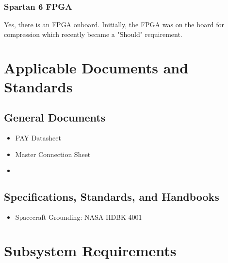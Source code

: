 \documentclass[12pt,a4paper]{article}
\begin{document}
    \subsubsection{Spartan 6 FPGA}
    Yes, there is an FPGA onboard. Initially, the FPGA was on the board for compression 
    which recently became a "Should" requirement. 



    \section{Applicable Documents and Standards}\label{sec:methods}
    \subsection{General Documents}
    \begin{itemize}
        \item PAY Datasheet
        \item Master Connection Sheet
        \item \cite{TAU_ProdSpec}
    \end{itemize}
    \subsection{Specifications, Standards, and Handbooks}
    \begin{itemize}
        \item Spacecraft Grounding: NASA-HDBK-4001
    \end{itemize}
   
    \newpage
    \section{Subsystem Requirements}\label{sec:requirements}
\end{document}

